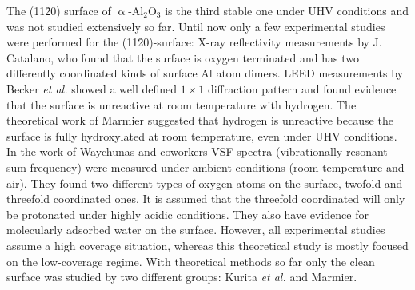 \documentclass[11pt,DIV=13,BCOR=5mm,a4paper,headinclude]{scrbook}
\begin{document}
The (11\=20) surface of $\upalpha$-Al$_2$O$_3$ is the third stable one under UHV conditions and was not studied extensively so far.
Until now only a few experimental studies were performed for the (11\=20)-surface: X-ray reflectivity measurements by J. Catalano\cite{catalano}, who found that the surface is oxygen terminated and has two differently coordinated kinds of surface Al atom dimers.
LEED measurements by Becker \textit{et al.}\cite{Becker2002} showed a well defined $1\times 1$ diffraction pattern and found evidence that the surface is unreactive at room temperature with hydrogen.
The theoretical work of Marmier\cite{marmier} suggested that hydrogen is unreactive because the surface is fully hydroxylated at room temperature, even under UHV conditions.
In the work of Waychunas and coworkers\cite{sung} VSF spectra (vibrationally resonant sum frequency) were measured under ambient conditions (room temperature and air).
They found two different types of oxygen atoms on the surface, twofold and threefold coordinated ones.
It is assumed that the threefold coordinated will only be protonated under highly acidic conditions.
They also have evidence for molecularly adsorbed water on the surface.
However, all experimental studies\cite{catalano,sung,Becker2002} assume a high coverage situation, whereas this theoretical study is mostly focused on the low-coverage regime.
With theoretical methods so far only the clean surface was studied by two different groups: Kurita \textit{et al.}\cite{kuri10} and Marmier\cite{marmier}.
\end{document}
